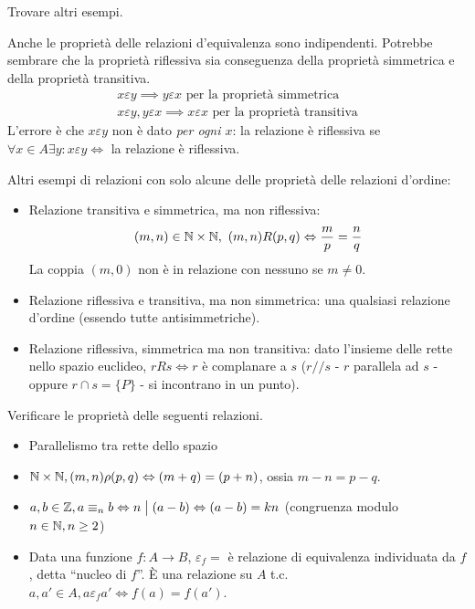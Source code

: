 \begin{esercizio}
Trovare altri esempi.
\end{esercizio}

Anche le propriet\`a delle relazioni d'equivalenza sono indipendenti. Potrebbe sembrare che la propriet\`a riflessiva sia conseguenza della propriet\`a simmetrica e della propriet\`a transitiva.
\begin{gather*}
x \varepsilon y \implies y \varepsilon x \text{ per la propriet\`a simmetrica} \\
x \varepsilon y , y \varepsilon x \implies x \varepsilon x \text{ per la propriet\`a transitiva}
\end{gather*}
L'errore \`e che $x \varepsilon y$ non \`e dato \textit{per ogni $x$}: la relazione \`e riflessiva se $\forall x \in A \exists y : x \varepsilon y \iff $ la relazione \`e riflessiva.

Altri esempi di relazioni con solo alcune delle propriet\`a delle relazioni d'ordine:
\begin{itemize}
  \item Relazione transitiva e simmetrica, ma non riflessiva:
  \[
  (m, n) \in \mathbb{N} \times \mathbb{N}, \ (m,n) R (p, q) \Leftrightarrow \frac{m}{p} = \frac{n}{q}
  \]
  La coppia $(m,0)$ non \`e in relazione con nessuno se $m \neq 0$.
  \item Relazione riflessiva e transitiva, ma non simmetrica: una qualsiasi relazione d'ordine (essendo tutte antisimmetriche).
  \item Relazione riflessiva, simmetrica ma non transitiva: dato l'insieme delle rette nello spazio euclideo, $r R s \iff r $ \`e complanare a $s$ ($r // s$ - $r$ parallela ad $s$ - oppure $r \cap s = \{ P \}$ - si incontrano in un punto).
\end{itemize}

\begin{esercizio}
Verificare le propriet\`a delle seguenti relazioni.
\begin{itemize}
  \item Parallelismo tra rette dello spazio \vspace{3cm}
  \item $\mathbb{N} \times \mathbb{N}, (m, n) \rho (p, q) \Leftrightarrow (m + q) = (p + n)$, ossia $m - n = p - q$. \vspace{3cm}
  \item $a, b \in \mathbb{Z}, a \equiv_n b \Leftrightarrow n \bigm| (a - b) \Leftrightarrow (a-b) = k n$ (congruenza modulo $n \in \mathbb{N}, n \ge 2$) \vspace{3cm}
  \item Data una funzione $f: A \to B $, $ \varepsilon_f = $ \`e relazione di equivalenza individuata da $f$, detta ``nucleo di $f$''. \`E una relazione su $A$ t.c. $a, a' \in A, a \varepsilon_f a' \iff f(a) = f(a')$. \vspace{3cm}
\end{itemize}
\end{esercizio}

